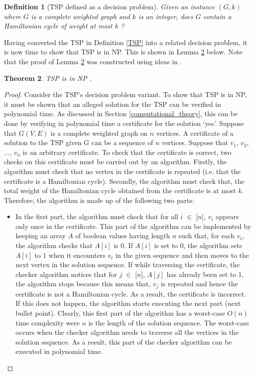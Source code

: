 \documentclass[12pt]{article}
\newtheorem{definition}{Definition}[subsection]
\newtheorem{theorem}[definition]{Theorem}
\numberwithin{equation}{subsection}
\numberwithin{table}{subsection}
\numberwithin{algorithm}{subsection}
\begin{document}
\begin{definition}[TSP defined as a decision problem]
\label{dec_prob}
Given an instance $(G,k)$ where $G$ is a complete weighted graph and $k$ is an integer, does $G$ contain a Hamiltonian cycle of weight at most $k$ \cite{cormen_leiserson_rivest_stein}?
\end{definition}
Having converted the TSP in Definition \ref{TSP} into a related decision problem, it is now time to show that TSP is in NP. This is shown in Lemma \ref{TSP_in_NP} below. Note that the proof of Lemma \ref{TSP_in_NP} was constructed using ideas in \cite{cormen_leiserson_rivest_stein}.
\begin{theorem}
\label{TSP_in_NP}
TSP is in NP {}.
\end{theorem}
\begin{proof}
Consider the TSP's decision problem variant. To show that TSP is in NP, it must be shown that an alleged solution for the TSP can be verified in polynomial time. As discussed in Section \ref{computational_theory}, this can be done by verifying in polynomial time a certificate for the solution `yes'. Suppose that $G(V,E)$ is a complete weighted graph on $n$ vertices. A certificate of a solution to the TSP given G can be a sequence of $n$ vertices. Suppose that $v_1$, $v_2$, ..., $v_n$ is an arbitrary certificate. To check that the certificate is correct, two checks on this certificate must be carried out by an algorithm. Firstly, the algorithm must check that no vertex in the certificate is repeated (i.e. that the certificate is a Hamiltonian cycle). Secondly, the algorithm must check that, the total weight of the Hamiltonian cycle obtained from the certificate is at most $k$. Therefore, the algorithm is made up of the following two parts:
\begin{itemize}
   \item In the first part, the algorithm must check that for all $i$ $\in$ [$n$], $v_i$ appears only once in the certificate. This part of the algorithm can be implemented by keeping an array $A$ of boolean values having length $n$ such that, for each $v_i$, the algorithm checks that $A[i]$ is $0$. If $A[i]$ is set to $0$, the algorithm sets $A[i]$ to $1$ when it encounters $v_i$ in the given sequence and then moves to the next vertex in the solution sequence. If while traversing the certificate, the checker algorithm notices that for $j$ $\in$ [$n$], $A[j]$ has already been set to 1, the algorithm stops because this means that, $v_j$ is repeated and hence the certificate is not a Hamiltonian cycle. As a result, the certificate is incorrect. If this does not happen, the algorithm starts executing the next part (next bullet point). Clearly, this first part of the algorithm has a worst-case $O(n)$ time complexity were $n$ is the length of the solution sequence. The worst-case occurs when the checker algorithm needs to traverse all the vertices in the solution sequence. As a result, this part of the checker algorithm can be executed in polynomial time.

\end{itemize}
\end{proof}
\end{document}
